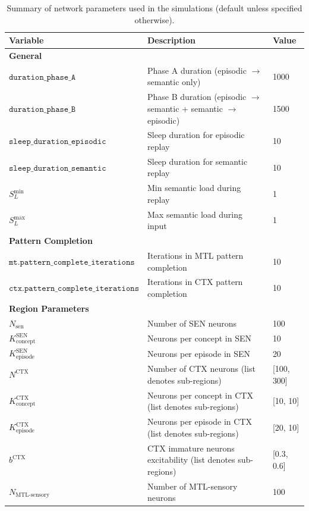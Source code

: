 \documentclass{article}
\begin{document}
\begin{table}[ht]
\small
\centering
\caption{Summary of network parameters used in the simulations (default unless specified otherwise).}
\label{tab:default_model}
\begin{tabular}{lp{6cm}l}
\toprule
\textbf{Variable} & \textbf{Description} & \textbf{Value} \\
\midrule
\multicolumn{3}{l}{\textbf{General}} \\
\midrule
$\texttt{duration\_phase\_A}$ & Phase A duration (episodic $\to$ semantic only) & 1000 \\
$\texttt{duration\_phase\_B}$ & Phase B duration (episodic $\to$ semantic + semantic $\to$ episodic) & 1500 \\
$\texttt{sleep\_duration\_episodic}$ & Sleep duration for episodic replay & 10 \\
$\texttt{sleep\_duration\_semantic}$ & Sleep duration for semantic replay & 10 \\
$S_L^\textrm{min}$ & Min semantic load during replay & 1 \\
$S_L^\textrm{max}$ & Max semantic load during input & 1 \\
\midrule
\multicolumn{3}{l}{\textbf{Pattern Completion}} \\
\midrule
$\texttt{mt.pattern\_complete\_iterations}$ & Iterations in MTL pattern completion & 10 \\
$\texttt{ctx.pattern\_complete\_iterations}$ & Iterations in CTX pattern completion & 10 \\
\midrule
\multicolumn{3}{l}{\textbf{Region Parameters}} \\
\midrule
$N_{\text{sen}}$ & Number of SEN neurons & 100 \\
$K^\textrm{SEN}_\textrm{concept}$ & Neurons per concept in SEN & 10 \\
$K^\textrm{SEN}_\textrm{episode}$ & Neurons per episode in SEN & 20 \\
$N^{\text{CTX}}$ & Number of CTX neurons (list denotes sub-regions) & [100, 300] \\
$K^\textrm{CTX}_\textrm{concept}$ & Neurons per concept in CTX (list denotes sub-regions) & [10,  10] \\
$K^\textrm{CTX}_\textrm{episode}$ & Neurons per episode in CTX (list denotes sub-regions) & [20,  10] \\
$b^\text{CTX}$ & CTX immature neurons excitability (list denotes sub-regions) & [0.3, 0.6] \\
$N_{\text{MTL-sensory}}$ & Number of MTL-sensory neurons & 100 \\

\end{tabular}
\end{table}
\end{document}
